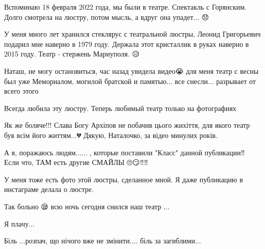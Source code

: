  
 
 
 
 

\qqSecCmt


Вспоминаю 18 февраля 2022 года, мы были в театре. Спектакль с Горянским.
Долго смотрела на люстру, потом мысль, а вдруг она упадет...
😞


У меня много лет хранился стеклярус с театральной люстры, Леонид Григорьевич
подарил мне наверно в 1979 году. Держала этот кристаллик в руках наверно в 2015
году. Театр - стержень Мариуполя. 😥


Наташ, не могу остановиться, час назад увидела видео😭 для меня театр с весны был
уже Мемориалом, могилой братской и памятью... все снесли... разрывает от всего
этого


Всегда любила эту люстру. Теперь любимый театр только на фотографиях


Як же боляче!!! Слава Богу Архіпов не побачив цього жихіття, для якого театр
був всім його життям...💔 Дякую, Наталочко, за відео минулих років.


А я, поражаюсь людям......🤦, которые поставили "Класс" данной публикации‼️ Если что, ТАМ есть другие СМАЙЛЫ 🙄😏‼️‼️


У меня тоже есть фото этой люстры, сделанное мной. Я даже публикацию в инстаграме делала о люстре.


Так больно 😪 всю ночь сегодня снился наш театр ...


Я плачу...


Біль ...розпач, що нічого вже не змінити.... біль за загиблими...

